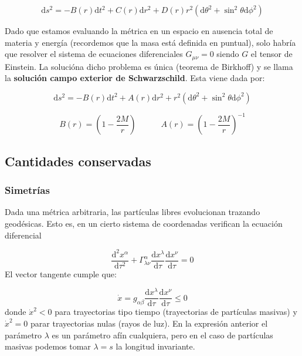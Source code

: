 \documentclass[12pt,a4paper]{book}
\numberwithin{equation}{section}
\numberwithin{figure}{section}
\newcommand{\parentesis}[1]{\left( #1  \right)}
\newcommand{\D}{\mathrm{d}}
\newcommand{\derivadas}[2]{\frac{\D #1}{\D #2}}
\newcommand{\tquad}{\quad \quad \quad}
\begin{document}
\begin{equation}
\D s^2 = - B(r) \D t^2 + C(r) \D r^2 + D(r) r^2(\D \theta^2 + \sin^2 \theta \D \phi^2) 
\end{equation}

Dado que estamos evaluando la métrica en un espacio en ausencia total de materia y energía (recordemos que la masa está definida en puntual), solo habría que resolver el sistema de ecuaciones diferenciales $G_{\mu \nu} = 0$ siendo $G$ el tensor de Einstein. La solucióna dicho problema es única (teorema de Birkhoff) y se llama la \textbf{solución campo exterior de Schwarzschild}. Esta viene dada por:


\begin{equation}
\D s^2 = - B(r) \D t^2 + A(r) \D r^2 + r^2(\D \theta^2 + \sin^2 \theta \D \phi^2) 
\label{Ec:04.002-Schwarzschild}
\end{equation}

\begin{equation}
B(r) =\parentesis{1-\frac{2M}{r}} \tquad A(r) = \parentesis{1-\frac{2M}{r}}^{-1}
\end{equation}

\subsection{Cantidades conservadas}

\subsubsection{Simetrías}

Dada una métrica arbitraria, las partículas libres evolucionan trazando geodésicas. Esto es, en un cierto sistema de coordenadas verifican la ecuación diferencial


\begin{equation}
\derivadas{^2x^\alpha}{\tau^2} + \Gamma^\alpha_{\lambda \nu} \derivadas{x^\lambda}{\tau	} \derivadas{x^\nu}{\tau} = 0
\end{equation}
El vector tangente cumple que:

\begin{equation}
\dot{x} = g_{\alpha \beta} \derivadas{x^\lambda}{\tau	} \derivadas{x^\nu}{\tau} \leq 0
\end{equation}
donde $\dot{x}^2<0$ para trayectorias tipo tiempo (trayectorias de partículas masivas) y $\dot{x}^2=0$ parar trayectorias nulas (rayos de luz). En la expresión anterior el parámetro $\lambda$ es un parámetro afín cualquiera, pero en el caso de partículas masivas podemos tomar $\lambda=s$ la longitud invariante. \\
\end{document}
